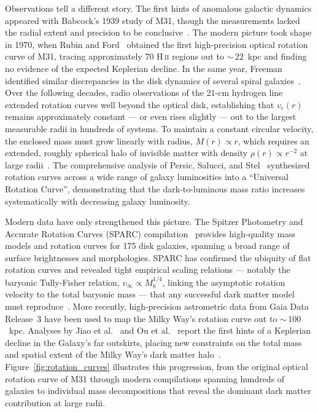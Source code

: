 Observations tell a different story.
The first hints of anomalous galactic dynamics appeared with Babcock's 1939 study of M31, though the measurements lacked the radial extent and precision to be conclusive~\cite{Cirelli:2024ssz}.
The modern picture took shape in 1970, when Rubin and Ford~\cite{Rubin:1970zza} obtained the first high-precision optical rotation curve of M31, tracing approximately 70 H\,\textsc{ii} regions out to ${\sim}\,22$~kpc and finding no evidence of the expected Keplerian decline.
In the same year, Freeman identified similar discrepancies in the disk dynamics of several spiral galaxies~\cite{Cirelli:2024ssz}.
Over the following decades, radio observations of the 21-cm hydrogen line extended rotation curves well beyond the optical disk, establishing that $v_c(r)$ remains approximately constant --- or even rises slightly --- out to the largest measurable radii in hundreds of systems.
To maintain a constant circular velocity, the enclosed mass must grow linearly with radius, $M(r) \propto r$, which requires an extended, roughly spherical halo of invisible matter with density $\rho(r) \propto r^{-2}$ at large radii~\cite{Cirelli:2024ssz}.
The comprehensive analysis of Persic, Salucci, and Stel~\cite{Persic:1995ru} synthesized rotation curves across a wide range of galaxy luminosities into a ``Universal Rotation Curve'', demonstrating that the dark-to-luminous mass ratio increases systematically with decreasing galaxy luminosity.

Modern data have only strengthened this picture.
The Spitzer Photometry and Accurate Rotation Curves (SPARC) compilation~\cite{Lelli:2016zqa} provides high-quality mass models and rotation curves for 175 disk galaxies, spanning a broad range of surface brightnesses and morphologies.
SPARC has confirmed the ubiquity of flat rotation curves and revealed tight empirical scaling relations --- notably the baryonic Tully-Fisher relation, $v_\infty \propto M_b^{1/4}$, linking the asymptotic rotation velocity to the total baryonic mass --- that any successful dark matter model must reproduce~\cite{Cirelli:2024ssz}.
More recently, high-precision astrometric data from Gaia Data Release~3 have been used to map the Milky Way's rotation curve out to ${\sim}\,100$~kpc.
Analyses by Jiao et al.~\cite{Jiao:2023aci} and Ou et al.~\cite{Ou:2023adg} report the first hints of a Keplerian decline in the Galaxy's far outskirts, placing new constraints on the total mass and spatial extent of the Milky Way's dark matter halo~\cite{Cirelli:2024ssz}.
Figure~\ref{fig:rotation_curves} illustrates this progression, from the original optical rotation curve of M31 through modern compilations spanning hundreds of galaxies to individual mass decompositions that reveal the dominant dark matter contribution at large radii.

